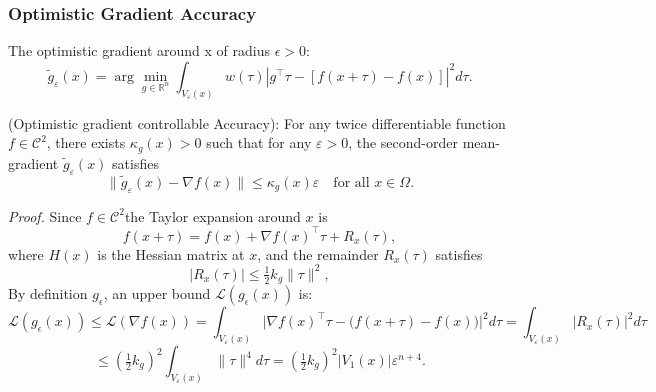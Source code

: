 \subsubsection{Optimistic Gradient Accuracy}
\label{optimistic_error_proof}
\begin{definition}
       The optimistic gradient around x of radius $\epsilon > 0$:   \[
   \tilde{g}_{\varepsilon}(x) = \arg\min_{g \in \mathbb{R}^n} \int_{V_{\varepsilon}(x)} w(\tau)\left| g^\top \tau  - [ f(x + \tau) - f(x) ] \right|^2 d\tau.
   \]
\end{definition}
\begin{theorem} (Optimistic gradient controllable Accuracy):
For any twice differentiable function \( f \in \mathcal{C}^2 \), there exists \( \kappa_g(x) > 0 \) such that for any \( \varepsilon > 0 \), the second-order mean-gradient \( \tilde{g}_{\varepsilon}(x) \) satisfies
\[
\| \tilde{g}_{\varepsilon}(x) - \nabla f(x) \| \leq \kappa_g(x) \varepsilon \quad \text{for all } x \in \Omega.
\]
\end{theorem}
\textit{Proof.}
   Since \( f \in \mathcal{C}^2 \)the Taylor expansion around \( x \) is\[
   f(x + \tau) = f(x) + \nabla f(x)^\top \tau + R_{x}(\tau),
   \]
   where \( H(x) \) is the Hessian matrix at \( x \), and the remainder \( R_{x}(\tau) \) satisfies \[
   | R_{x}(\tau) | \leq \tfrac{1}{2} k_g \| \tau \|^2,
   \]
By definition \(g_\epsilon\), an upper bound  \(\mathcal{L}(g_\epsilon(x))\)  is:   \[
   \mathcal{L}(g_\epsilon(x)) \leq \mathcal{L}(\nabla f(x)) = \int_{V_{\varepsilon}(x)} \Big| \nabla f(x)^\top \tau - \big( f(x + \tau) - f(x) \big) \Big|^2 d\tau = \int_{V_{\varepsilon}(x)} | R_{x}(\tau) |^2 d\tau
\]
\[
   \leq \left( \tfrac{1}{2} k_g \right)^2 \int_{V_{\varepsilon}(x)} \| \tau \|^4 d\tau = \left( \tfrac{1}{2} k_g \right)^2|V_1(x)| \varepsilon^{n+4}.
\]

